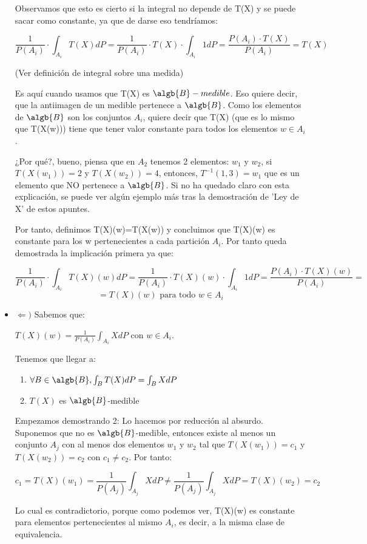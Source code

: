 \begin{problem}[2]
\begin{itemize}
Observamos que esto es cierto si la integral no depende de T(X) y se puede sacar como constante, ya que de darse eso tendríamos:

\[
\frac{1}{P(A_i)}\cdot\int_{A_i}T(X)dP = \frac{1}{P(A_i)}\cdot T(X)\cdot\int_{A_i}1dP = \frac{P(A_i) \cdot T(X)}{P(A_i)} = T(X)
\]

(Ver definición de integral sobre una medida)

Es aquí cuando usamos que T(X) es $\algb{B}-medible$. Eso quiere decir, que la antiimagen de un medible pertenece a $\algb{B}$. Como los elementos de $\algb{B}$ son los conjuntos $A_i$, quiere decir que T(X) (que es lo mismo que T(X(w))) tiene que tener valor constante para todos los elementos $w \in A_i$. 

¿Por qué?, bueno, piensa que en $A_2$ tenemos 2 elementos: $w_1$ y $w_2$, si $T(X(w_1))=2$ y $T(X(w_2))=4$, entonces, $T^{-1}(1,3)=w_1$ que es un elemento que NO pertenece a $\algb{B}$. Si no ha quedado claro con esta explicación, se puede ver algún ejemplo más tras la demostración de 'Ley de X' de estos apuntes.

Por tanto, definimos T(X)(w)=T(X(w)) y concluimos que T(X)(w) es constante para los w pertenecientes a cada partición $A_i$. Por tanto queda demostrada la implicación primera ya que:

\[
\frac{1}{P(A_i)}\cdot\int_{A_i}T(X)(w)dP = \frac{1}{P(A_i)}\cdot T(X)(w)\cdot\int_{A_i}1dP = \frac{P(A_i) \cdot T(X)(w)}{P(A_i)} =
\]
\[
=T(X)(w)  \text{ para todo } w \in A_i
\]

\item $\Leftarrow)$ Sabemos que:

$T(X)(w)= \frac{1}{P(A_i)}\int_{A_i} X dP$ con $w \in A_i$.

Tenemos que llegar a: 
\begin{enumerate}
\item $\forall B \in \algb{B}, \int_{B}T(X)dP = \int_{B}XdP$
\item $T(X)$ es $\algb{B}$-medible
\end{enumerate}

Empezamos demostrando 2: Lo hacemos por reducción al absurdo. Suponemos que no es $\algb{B}$-medible, entonces existe al menos un conjunto $A_j$ con al menos dos elementos $w_1$ y $w_2$ tal que $T(X(w_1))=c_1$ y $T(X(w_2))=c_2$ con $c_1 \neq c_2$. Por tanto:

\[
c_1=T(X)(w_1)=\frac{1}{P(A_j)}\int_{A_j} X dP \neq \frac{1}{P(A_j)}\int_{A_j} X dP=T(X)(w_2)=c_2
\]

Lo cual es contradictorio, porque como podemos ver, T(X)(w) es constante para elementos pertenecientes al mismo $A_i$, es decir, a la misma clase de equivalencia.


\end{itemize}
\end{problem}
